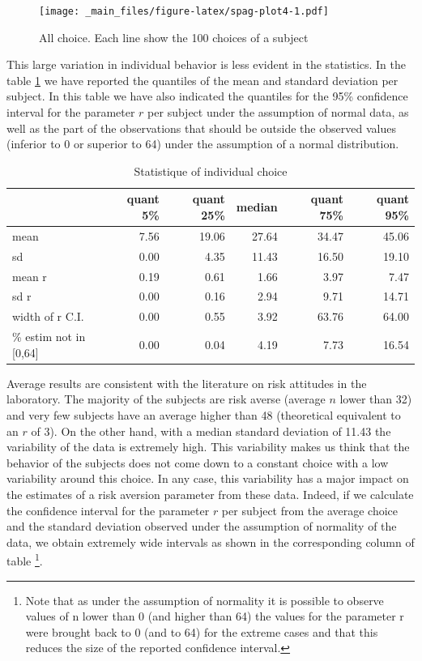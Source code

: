 \documentclass[
]{book}
\begin{document}
\begin{figure}
\centering
\texttt{[image: \_main\_files/figure-latex/spag-plot4-1.pdf]}
\caption{\label{fig:spag-plot4}All choice. Each line show the 100 choices of a subject}
\end{figure}

This large variation in individual behavior is less evident in the
statistics.
In the table \ref{tab:sum-stat-table4} we have reported the
quantiles of the mean and standard deviation per subject.
In this table we have also indicated the quantiles for the 95\% confidence
interval for the parameter \(r\) per subject under the assumption of normal data,
as well as the part of the observations that should be outside the observed
values (inferior to 0 or superior to 64) under the assumption of a normal
distribution.

\begin{table}

\caption{\label{tab:sum-stat-table4}Statistique of individual choice}
\centering
\begin{tabular}[t]{l|r|r|r|r|r}
\hline
  & quant 5\% & quant 25\% & median & quant 75\% & quant 95\%\\
\hline
mean & 7.56 & 19.06 & 27.64 & 34.47 & 45.06\\
\hline
sd & 0.00 & 4.35 & 11.43 & 16.50 & 19.10\\
\hline
mean r & 0.19 & 0.61 & 1.66 & 3.97 & 7.47\\
\hline
sd r & 0.00 & 0.16 & 2.94 & 9.71 & 14.71\\
\hline
width of r C.I. & 0.00 & 0.55 & 3.92 & 63.76 & 64.00\\
\hline
\% estim not in [0,64] & 0.00 & 0.04 & 4.19 & 7.73 & 16.54\\
\hline
\end{tabular}
\end{table}

Average results are consistent with
the literature on risk attitudes in the laboratory. The majority of the subjects
are risk averse (average \(n\) lower than 32) and very few subjects have an
average higher than 48 (theoretical equivalent to an \(r\) of 3). On the
other hand, with a median standard deviation of
11.43 the variability of the data is
extremely high. This variability makes us think that the behavior of the
subjects does not come down to a constant choice with a low variability
around this choice. In any case, this variability has a major impact on
the estimates of a risk aversion parameter from these data. Indeed, if we
calculate the confidence interval for the parameter \(r\) per subject from
the average choice and the standard deviation observed under the
assumption of normality of the data, we obtain extremely wide intervals
as shown in the corresponding column of table \footnote{Note that as under the assumption of normality it is possible to
  observe values of n lower than 0 (and higher than 64) the values for
  the parameter r were brought back to 0 (and to 64) for the extreme
  cases and that this reduces the size of the reported confidence
  interval.}.
\end{document}
